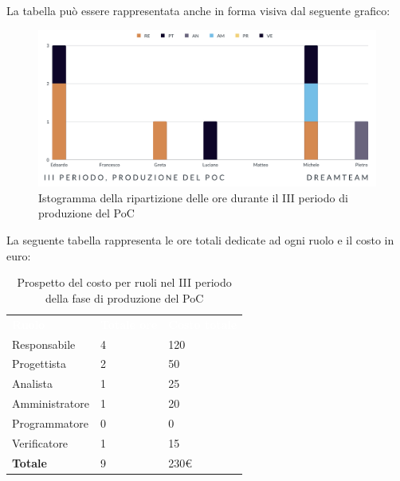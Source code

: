 La tabella può essere rappresentata anche in forma visiva dal seguente grafico:
\begin{figure}[H]
\centering
\includegraphics[scale=0.65]{Sezioni/SezioniPreventivo/grafici/Poc_III_periodo.png}
\caption{Istogramma della ripartizione delle ore durante il III periodo di produzione del PoC}
\end{figure}

La seguente tabella rappresenta le ore totali dedicate ad ogni ruolo e il costo in euro:

\begin{table}[H]
\begin{center}
\renewcommand{\arraystretch}{1.5}
\begin{tabular}{ m{}<{\centering}  m{}<{\centering} m{}<{\centering}}
	\rowcolor{darkblue}
	\textcolor{white}{\textbf{Ruolo}}&\textcolor{white}{\textbf{Totale ore}}&\textcolor{white}{\textbf{Costo totale}}\\ 

	Responsabile  & 4 & 120\\	
	
	Progettista & 2 & 50\\
	
	Analista & 1 & 25 \\

	Amministratore & 1 & 20 \\
	
	Programmatore & 0 & 0 \\
	
	Verificatore & 1 & 15 \\
	
	\textbf{Totale} & 9 & 230\euro \\
	
\end{tabular}
\caption{Prospetto del costo per ruoli nel III periodo della fase di produzione del PoC}
\end{center}
\end{table}

